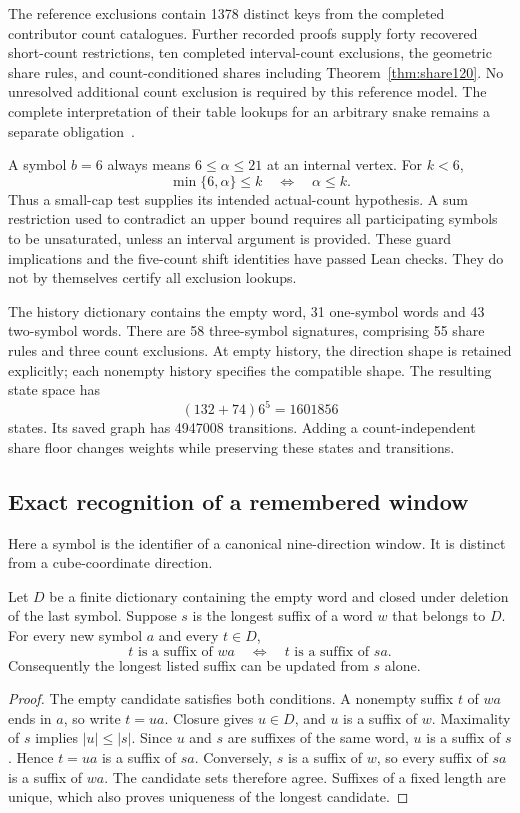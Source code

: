 The reference exclusions contain 1378 distinct keys from the completed contributor count catalogues. Further recorded proofs supply forty recovered short-count restrictions, ten completed interval-count exclusions, the geometric share rules, and count-conditioned shares including Theorem~\ref{thm:share120}. No unresolved additional count exclusion is required by this reference model. The complete interpretation of their table lookups for an arbitrary snake remains a separate obligation~\cite{currentarchive}.

A symbol $b=6$ always means $6\le\alpha\le21$ at an internal vertex. For $k<6$,
\[
\min\{6,\alpha\}\le k\quad\Longleftrightarrow\quad\alpha\le k.
\]
Thus a small-cap test supplies its intended actual-count hypothesis. A sum restriction used to contradict an upper bound requires all participating symbols to be unsaturated, unless an interval argument is provided. These guard implications and the five-count shift identities have passed Lean checks. They do not by themselves certify all exclusion lookups.

The history dictionary contains the empty word, 31 one-symbol words and 43 two-symbol words. There are 58 three-symbol signatures, comprising 55 share rules and three count exclusions. At empty history, the direction shape is retained explicitly; each nonempty history specifies the compatible shape. The resulting state space has
\[
(132+74)6^5=1601856
\]
states. Its saved graph has 4947008 transitions. Adding a count-independent share floor changes weights while preserving these states and transitions.

\subsection{Exact recognition of a remembered window}\label{sec:exact-history}
Here a symbol is the identifier of a canonical nine-direction window. It is distinct from a cube-coordinate direction.

\begin{lemma}\label{lem:longest-suffix}
Let $D$ be a finite dictionary containing the empty word and closed under deletion of the last symbol. Suppose $s$ is the longest suffix of a word $w$ that belongs to $D$. For every new symbol $a$ and every $t\in D$,
\[
t\text{ is a suffix of }wa
\quad\Longleftrightarrow\quad
t\text{ is a suffix of }sa.
\]
Consequently the longest listed suffix can be updated from $s$ alone.
\end{lemma}
\begin{proof}
The empty candidate satisfies both conditions. A nonempty suffix $t$ of $wa$ ends in $a$, so write $t=ua$. Closure gives $u\in D$, and $u$ is a suffix of $w$. Maximality of $s$ implies $|u|\le|s|$. Since $u$ and $s$ are suffixes of the same word, $u$ is a suffix of $s$. Hence $t=ua$ is a suffix of $sa$. Conversely, $s$ is a suffix of $w$, so every suffix of $sa$ is a suffix of $wa$. The candidate sets therefore agree. Suffixes of a fixed length are unique, which also proves uniqueness of the longest candidate.
\end{proof}

